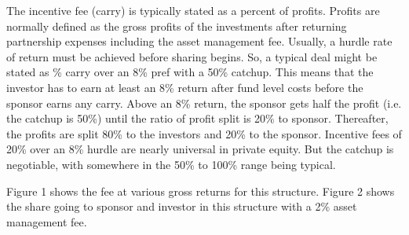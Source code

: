 \documentclass[12pt,english]{article}\usepackage[]{graphicx}\usepackage[]{color}
\begin{document}
The incentive fee (\textquotedbl carry\textquotedbl ) is typically
stated as a percent of profits. Profits are normally defined as the
gross profits of the investments after returning partnership expenses
including the asset management fee. Usually, a hurdle rate of return
must be achieved before sharing begins. So, a typical deal might be
stated as \% carry over an 8\% pref with a 50\% catchup\textquotedbl .
This means that the investor has to earn at least an 8\% return after
fund level costs before the sponsor earns any carry. Above an 8\%
return, the sponsor gets half the profit (i.e. the catchup is 50\%)
until the ratio of profit split is 20\% to sponsor. Thereafter, the
profits are split 80\% to the investors and 20\% to the sponsor. Incentive
fees of 20\% over an 8\% hurdle are nearly universal in private equity.
But the catchup is negotiable, with somewhere in the 50\% to 100\%
range being typical. 

Figure 1 shows the fee at various gross returns for this structure.
Figure 2 shows the share going to sponsor and investor in this structure
with a 2\% asset management fee. 
\end{document}
